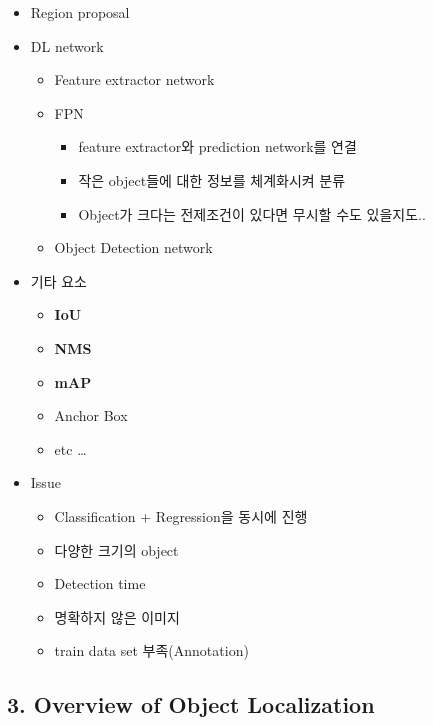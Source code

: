 \documentclass[
]{article}
\providecommand{\tightlist}{%
  \setlength{\itemsep}{0pt}\setlength{\parskip}{0pt}}
\begin{document}
\begin{itemize}
\tightlist
\item
  Region proposal
\item
  DL network

  \begin{itemize}
  \tightlist
  \item
    Feature extractor network
  \item
    FPN

    \begin{itemize}
    \tightlist
    \item
      feature extractor와 prediction network를 연결
    \item
      작은 object들에 대한 정보를 체계화시켜 분류
    \item
      Object가 크다는 전제조건이 있다면 무시할 수도 있을지도..
    \end{itemize}
  \item
    Object Detection network
  \end{itemize}
\item
  기타 요소

  \begin{itemize}
  \tightlist
  \item
    \textbf{IoU}
  \item
    \textbf{NMS}
  \item
    \textbf{mAP}
  \item
    Anchor Box
  \item
    etc \ldots{}
  \end{itemize}
\item
  Issue

  \begin{itemize}
  \tightlist
  \item
    Classification + Regression을 동시에 진행
  \item
    다양한 크기의 object
  \item
    Detection time
  \item
    명확하지 않은 이미지
  \item
    train data set 부족(Annotation)
  \end{itemize}
\end{itemize}

\hypertarget{overview-of-object-localization}{%
\subsection{3. Overview of Object
Localization}\label{overview-of-object-localization}}
\end{document}
